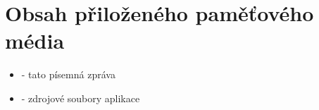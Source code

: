 
\chapter{Obsah přiloženého paměťového média}
    \begin{itemize}
        \item {} - tato písemná zpráva
        \item {} - zdrojové soubory aplikace        
    \end{itemize}



